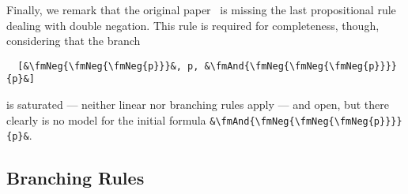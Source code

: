 \documentclass[sigplan,10pt,anonymous,review]{acmart}
\newcommand{\fmAnd}[2]{#1 $\boldsymbol{\land}$ #2}
\newcommand{\fmOr}[2]{#1 $\boldsymbol{\lor}$ #2}
\newcommand{\fmNegSymbol}{\boldsymbol{\neg}}
\newcommand{\fmNeg}[1]{$\fmNegSymbol$ #1}
\begin{document}
Finally, we remark that the original paper~\cite{new_fast_tableau} is missing the last propositional rule dealing with double negation.
This rule is required for completeness, though, considering that the branch
\begin{lstlisting}
  [&\fmNeg{\fmNeg{\fmNeg{p}}}&, p, &\fmAnd{\fmNeg{\fmNeg{\fmNeg{p}}}}{p}&]
\end{lstlisting}
is saturated --- neither linear nor branching rules apply --- and open, but there clearly is no model for the initial formula \lstinline!&\fmAnd{\fmNeg{\fmNeg{\fmNeg{p}}}}{p}&!.

\subsection{Branching Rules\label{sec:branching}}
\end{document}
